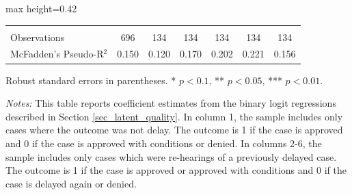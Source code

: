 \begin{table}[H]
\begin{adjustbox}{max height=0.42\textheight}
\begin{threeparttable}
\begin{tabular}{lcccccc}
 & & & & \\ 
Observations  & 696 & 134 & 134 & 134 & 134 & 134 \\ [1.8ex]
McFadden's Pseudo-R$^2$ & 0.150 & 0.120 & 0.170 & 0.202 & 0.221 & 0.156 \\ [1.8ex]
\bottomrule
\end{tabular}
\begin{tablenotes}[flushleft]
\footnotesize
\item Robust standard errors in parentheses. * $p<0.1$, ** $p<0.05$, *** $p<0.01$.
\item \textit{Notes:} This table reports coefficient estimates from the binary logit regressions described in Section \ref{sec_latent_quality}. 
In column 1, the sample includes only cases where the outcome was not delay. The outcome is 1 if the case is approved and 0 if the case is approved with conditions or denied. In columns 2-6, the sample includes only cases which were re-hearings of a previously delayed case. The outcome is 1 if the case is approved or approved with conditions and 0 if the case is delayed again or denied. 
\end{tablenotes}
\end{threeparttable}
\end{adjustbox}
\end{table}
